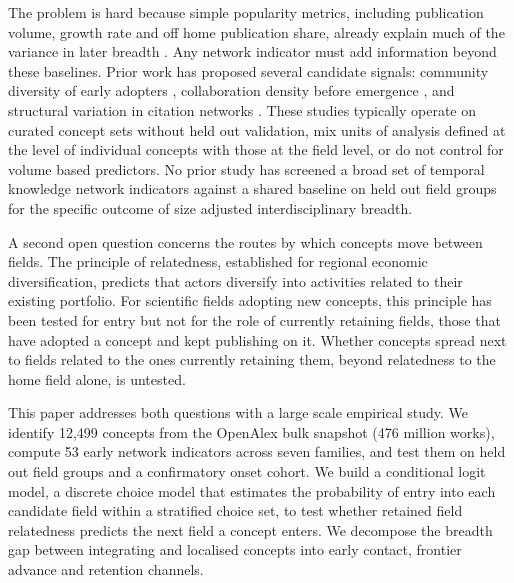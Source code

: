\documentclass[11pt,letterpaper]{article}
\begin{document}
The problem is hard because simple popularity metrics, including publication
volume, growth rate and off home publication share, already explain much of the
variance in later breadth \citep{Rotolo2015}. Any network indicator must add
information beyond these baselines. Prior work has proposed several candidate
signals: community diversity of early adopters \citep{Weng2013}, collaboration
density before emergence \citep{Salatino2017}, and structural variation in
citation networks \citep{Salatino2018}. These studies typically operate on
curated concept sets without held out validation, mix units of analysis defined
at the level of individual concepts with those at the field level, or do not
control for volume based predictors.
No prior study has screened a broad set of temporal knowledge network indicators
against a shared baseline on held out field groups for the specific outcome of
size adjusted interdisciplinary breadth.

A second open question concerns the routes by which concepts move between
fields. The principle of relatedness, established for regional economic
diversification, predicts that actors diversify into activities related to their
existing portfolio. For scientific fields adopting new concepts, this principle
has been tested for entry but not for the role of currently retaining fields,
those that have adopted a concept and kept publishing on it. Whether concepts
spread next to fields related to the ones currently retaining them, beyond
relatedness to the home field alone, is untested.

This paper addresses both questions with a large scale empirical study. We
identify 12,499 concepts from the OpenAlex bulk snapshot (476 million works),
compute 53 early network indicators across seven families, and test them on
held out field groups and a confirmatory onset cohort. We build a
conditional logit model, a discrete choice model that estimates the probability
of entry into each candidate field within a stratified choice set, to test
whether retained field
relatedness predicts the next field a concept enters. We decompose the breadth
gap between integrating and localised concepts into early contact, frontier
advance and retention channels.
\end{document}
